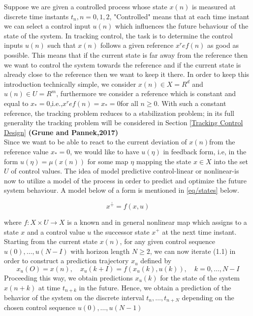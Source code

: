 \documentclass{UoNMCHA}
\numberwithin{equation}{section}
\begin{document}
	Suppose we are given a controlled process whose state $x(n)$ is measured at discrete time instants $t_n,n=0,1,2$, "Controlled" means that at each time instant we can select a control input $u(n)$ which 
	influences the future behaviour of the state of the system. In tracking control, the task is to determine the control inputs $u(n)$ such that $x(n)$ follows a given reference $x^ref  (n)$ as good as possible. This means that if the current state is far away from the reference then we want to control the system towards the reference and if the current state is already close to the reference then we want to keep it there. In order to keep this introduction technically simple, we consider $x(n)\in X=R^d$ and $u(n)\in U=R^m$, furthermore we consider a reference which is constant and equal to $x_{*}=0$,i.e.,$x^ref (n)=x_{*}=0 $for all $n\geq 0$. With such a constant reference, the tracking problem reduces to a stabilization problem; in its full generality the tracking problem will be considered in Section \ref{Tracking Control Design} \textbf{(Grune and Pannek,2017)} \\
	
	Since we want to be able to react to the current deviation of $x(n)$from the reference value $x_{*}=0$, we would like to have $u(\eta)$ in feedback form, i.e, in the form $u(\eta)=\mu(x(n))$ for some map $\eta$ mapping the state $x \in X$ into the set $U$ of control values. The idea of model predictive control-linear or nonlinear-is now to utilize a model of the process in order to predict and optimize the future system behaviour. A model below of a  form is mentioned in \ref{eq/states} below.
	
	\begin{equation} \label{eq/states}
	x^{\dotplus}=f(x,u)
	\end{equation}
	
	where $f: X \times U \rightarrow X$ is a known and in general nonlinear map which assigns to a state $x$ and a control
	value $u$ the successor state $x^{+}$ at the next time instant. Starting
	from the current state $x(n)$, for any given control sequence $u(0), \ldots, u(N-I)$ with horizon length
	$N \geq 2$, we can now iterate (1.1) in order to construct a prediction trajectory $x_{u}$ defined by
	$$
	x_{u}(O)=x(n), \quad x_{u}(k+I)=f\left(x_{u}(k), u(k)\right), \quad k=0, \ldots, N-I
	$$
	Proceeding this way, we obtain predictions $x_{u}(k)$ for the state of the system $x(n+k)$ at time $t_{n+k}$ in
	the future. Hence, we obtain a prediction of the behavior of the system on the discrete interval
	$t_{n}, \ldots, t_{n+N}$ depending on the chosen control sequence $u(0), \ldots, u(N-1)$
	
\end{document}
